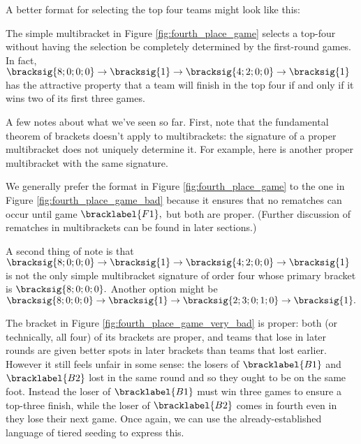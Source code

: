 {    A better format for selecting the top four teams might look like this:


    The simple multibracket in Figure \ref{fig:fourth_place_game} selects a top-four without having the selection be completely determined by the first-round games. In fact, $\bracksig{8;0;0;0} \to \bracksig{1} \to \bracksig{4; 2; 0; 0} \to \bracksig{1}$ has the attractive property that a team will finish in the top four if and only if it wins two of its first three games.

    A few notes about what we've seen so far. First, note that the fundamental theorem of brackets doesn't apply to multibrackets: the signature of a proper multibracket does not uniquely determine it. For example, here is another proper multibracket with the same signature.


    We generally prefer the format in Figure \ref{fig:fourth_place_game} to the one in Figure \ref{fig:fourth_place_game_bad} because it ensures that no rematches can occur until game $\bracklabel{F1},$ but both are proper. (Further discussion of rematches in multibrackets can be found in later sections.)

    A second thing of note is that $\bracksig{8;0;0;0} \to \bracksig{1} \to \bracksig{4; 2; 0; 0} \to \bracksig{1}$ is not the only simple multibracket signature of order four whose primary bracket is $\bracksig{8;0;0;0}.$ Another option might be $\bracksig{8;0;0;0} \to \bracksig{1} \to \bracksig{2; 3; 0; 1; 0} \to \bracksig{1}.$


    The bracket in Figure \ref{fig:fourth_place_game_very_bad} is proper: both (or technically, all four) of its brackets are proper, and teams that lose in later rounds are given better spots in later brackets than teams that lost earlier. However it still feels unfair in some sense: the losers of $\bracklabel{B1}$ and $\bracklabel{B2}$ lost in the same round and so they ought to be on the same foot. Instead the loser of $\bracklabel{B1}$ must win three games to ensure a top-three finish, while the loser of $\bracklabel{B2}$ comes in fourth even in they lose their next game. Once again, we can use the already-established language of tiered seeding to express this.

}
